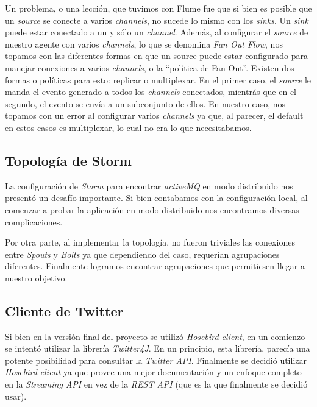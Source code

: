 \documentclass[a4paper,10pt]{article}
\begin{document}
Un problema, o una lección, que tuvimos con Flume fue que si bien es posible que un \textit{source} se conecte a varios \textit{channels}, no sucede lo mismo con los \textit{sinks}.
Un \textit{sink} puede estar conectado a un y sólo un \textit{channel}. Además, al configurar el \textit{source} de nuestro agente con varios \textit{channels}, lo que
se denomina \textit{Fan Out Flow}, nos topamos con las
diferentes formas en que un source puede estar configurado para manejar conexiones a varios \textit{channels}, o la ``política de Fan Out''. Existen dos formas o políticas para esto:
replicar o multiplexar. En el primer caso, el \textit{source} le manda el evento generado a todos los \textit{channels} conectados, mientrás que en el segundo, el evento se envía
a un subconjunto de ellos. En nuestro caso, nos topamos con un error al configurar varios \textit{channels} ya que, al parecer, el default en estos casos es multiplexar, lo cual no
era lo que necesitabamos.

\subsection{Topología de Storm}

La configuración de \textit{Storm} para encontrar \textit{activeMQ} en modo distribuido nos presentó un desafío importante. Si bien contabamos con la configuración local,
al comenzar a probar la aplicación en modo distribuido nos encontramos diversas complicaciones.

Por otra parte, al implementar la topología, no fueron triviales las conexiones entre \textit{Spouts} y \textit{Bolts} ya que dependiendo del caso, requerían agrupaciones
diferentes. Finalmente logramos encontrar agrupaciones que permitiesen llegar a nuestro objetivo.

\subsection{Cliente de Twitter}

Si bien en la versión final del proyecto se utilizó \textit{Hosebird client}, en un comienzo se intentó utilizar la librería \textit{Twitter4J}. En un principio, esta librería,
parecía una potente posibilidad para consultar la \textit{Twitter API}. Finalmente se decidió utilizar \textit{Hosebird client} ya que provee una mejor documentación y un enfoque
completo en la \textit{Streaming API} en vez de la \textit{REST API} (que es la que finalmente se decidió usar).
\end{document}
